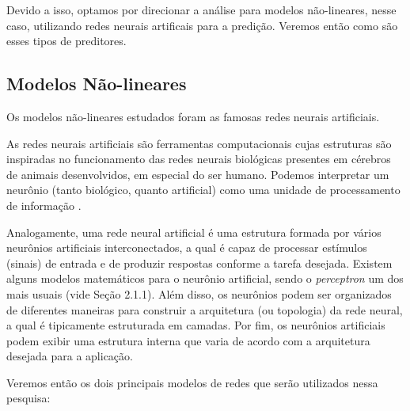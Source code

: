 \documentclass[a4paper, 12pt]{article}
\begin{document}
Devido a isso, optamos por direcionar a análise para modelos não-lineares, nesse caso, utilizando redes neurais artificais para a predição. Veremos então como são esses tipos de preditores.

\subsection{Modelos Não-lineares}

Os modelos não-lineares estudados foram as famosas redes neurais artificiais.

As redes neurais artificiais são ferramentas computacionais cujas estruturas são inspiradas no funcionamento das redes neurais biológicas presentes em cérebros de animais desenvolvidos, em especial do ser humano. Podemos interpretar um neurônio (tanto biológico, quanto artificial) como uma unidade de processamento de informação \cite{haykin2010neural}. 

Analogamente, uma rede neural artificial é uma estrutura formada por vários neurô\-nios artificiais interconectados, a qual é capaz de processar estímulos (sinais) de entrada e de produzir respostas conforme a tarefa desejada. Existem alguns modelos matemáticos para o neurônio artificial, sendo o \textit{perceptron} um dos mais usuais (vide Seção 2.1.1). Além disso, os neurônios podem ser organizados de diferentes maneiras para construir a arquitetura (ou topologia) da rede neural, a qual é tipicamente estruturada em camadas. Por fim, os neurônios artificiais podem exibir uma estrutura interna que varia de acordo com a arquitetura desejada para a aplicação.

Veremos então os dois principais modelos de redes que serão utilizados nessa pesquisa:
\end{document}
